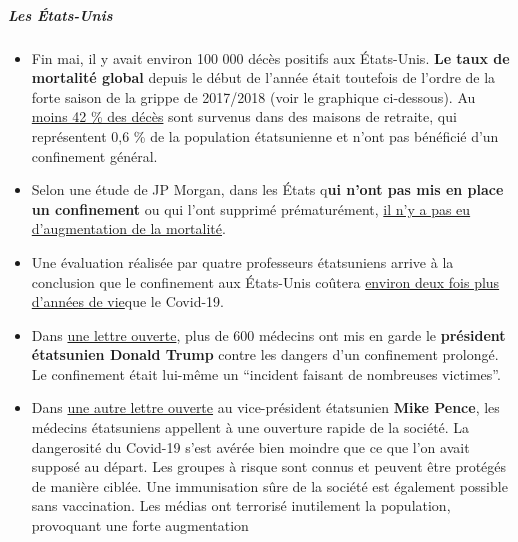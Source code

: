 \hypertarget{les-uxe9tats-unis}{%
\subparagraph{\texorpdfstring{\textbf{Les
États-Unis}}{Les États-Unis}}\label{les-uxe9tats-unis}}

\begin{itemize}
\tightlist
\item
  Fin mai, il y avait environ 100 000 décès positifs aux États-Unis.
  \textbf{Le taux de mortalité global} depuis le début de l'année était
  toutefois de l'ordre de la forte saison de la grippe de 2017/2018
  (voir le graphique ci-dessous). Au
  \href{https://www.forbes.com/sites/theapothecary/2020/05/26/nursing-homes-assisted-living-facilities-0-6-of-the-u-s-population-43-of-u-s-covid-19-deaths/}{moins
  42 \% des décès} sont survenus dans des maisons de retraite, qui
  représentent 0,6 \% de la population étatsunienne et n'ont pas
  bénéficié d'un confinement général.
\item
  Selon une étude de JP Morgan, dans les États q\textbf{ui n'ont pas mis
  en place un confinement} ou qui l'ont supprimé prématurément,
  \href{https://www.dailymail.co.uk/news/article-8347635/Lockdowns-failed-alter-course-pandemic-JP-Morgan-study-claims.html}{il
  n'y a pas eu d'augmentation de la mortalité}.
\item
  Une évaluation réalisée par quatre professeurs étatsuniens arrive à la
  conclusion que le confinement aux États-Unis coûtera
  \href{https://thehill.com/opinion/healthcare/499394-the-covid-19-shutdown-will-cost-americans-millions-of-years-of-life}{environ
  deux fois plus d'années de vie}que le Covid-19.
\item
  Dans
  \href{https://www.washingtonexaminer.com/news/mass-casualty-incident-over-600-doctors-sign-letter-warning-trump-of-dangers-of-continued-lockdowns}{une
  lettre ouverte}, plus de 600 médecins ont mis en garde le
  \textbf{président étatsunien Donald Trump} contre les dangers d'un
  confinement prolongé. Le confinement était lui-même un ``incident
  faisant de nombreuses victimes''.
\item
  Dans
  \href{https://aapsonline.org/physician-letter-reopen-america/}{une
  autre lettre ouverte} au vice-président étatsunien \textbf{Mike
  Pence}, les médecins étatsuniens appellent à une ouverture rapide de
  la société. La dangerosité du Covid-19 s'est avérée bien moindre que
  ce que l'on avait supposé au départ. Les groupes à risque sont connus
  et peuvent être protégés de manière ciblée. Une immunisation sûre de
  la société est également possible sans vaccination. Les médias ont
  terrorisé inutilement la population, provoquant une forte augmentation

\end{itemize}
